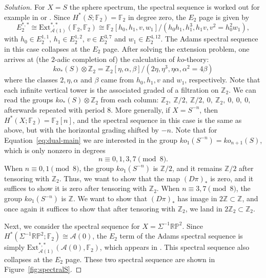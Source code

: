 \documentclass{amsart}
\def\RP{\mathbb{RP}}
\newcommand{\Ext}{\mathrm{Ext}}
\newcommand{\Steenrod}{\mathcal{A}}
\newcommand{\Aone}{\Steenrod(1)}
\newcommand{\Azero}{\Steenrod(0)}
\newcommand{\FF}{\mathbb{F}}
\newcommand{\ZZ}{\mathbb{Z}}
\begin{document}
\begin{proof}[Solution]
For $X=S$ the sphere spectrum, the spectral sequence is worked out
for example in \cite[Theorems 3.1.25 and 3.1.26]{Ravenel} or
\cite[Proposition 6.29]{RognesNotes}. Since
$H^*(S;\FF_2)=\FF_2$ in degree zero, the $E_2$ page is given by
\[
  E_2^{*, *} \cong \Ext^{*, *}_{\Aone}(\FF_2, \FF_2) \cong \FF_2[h_0, h_1, v, w_1] / (h_0h_1, h_1^3, h_1v, v^2=h_0^2w_1),
\]
with $h_0 \in E_2^{1,1}$, $h_1 \in E_2^{1,2}$, $v \in E_2^{3,7}$ and $w_1 \in E_2^{4, 12}$. The Adams spectral sequence in this case collapses at the $E_2$ page. After solving the extension problem, one arrives at (the $2$-adic completion of) the calculation of $ko$-theory:
\[
  ko_*(S) \otimes \ZZ_2 = \ZZ_2[\eta, \alpha, \beta]/(2\eta, \eta^3, \eta \alpha, \alpha^2 = 4\beta)
\]
where the classes $2, \eta, \alpha$ and $\beta$ came from
$h_0, h_1, v$ and $w_1$, respectively. Note that each infinite
vertical tower is the associated graded of a filtration on $\ZZ_2$. We
can read the groups $ko_*(S) \otimes \ZZ_2$ from each column:
$\ZZ_2, \ \ZZ/2, \ \ZZ/2, \ 0,\ \ZZ_2, \ 0, \ 0, \ 0,$ afterwards
repeated with period $8$.  More generally, if $X=S^{-n}$, then
$H^*(X;\FF_2)=\FF_2[n]$, and the spectral sequence in this case is the
same as above, but with the horizontal grading shifted by $-n$. Note
that for Equation~\eqref{eq:dual-main} we are interested in the
group $ko_1(S^{-n})= ko_{n+1}(S)$, which is only nonzero in degrees
\begin{equation}
\label{eq:ns}
 n \equiv 0, 1, 3, 7 \!\!\!\!\pmod{8}.
\end{equation}
When $n \equiv 0, 1 \!\!\pmod{8}$, the group $ko_1(S^{-n})$ is
$\ZZ/2$, and it remains $\ZZ/2$ after tensoring with $\ZZ_2$. Thus, we
want to show that the map $(D\pi)_*$ is zero, and it suffices to show
it is zero after tensoring with $\ZZ_2$. When
$n \equiv 3, 7 \!\!\pmod{8}$, the group $ko_1(S^{-n})$ is $\ZZ$. We
want to show that $(D\pi)_*$ has image in $2\ZZ \subset \ZZ$, and once
again it suffices to show that after tensoring with $\ZZ_2$, we land
in $2\ZZ_2 \subset \ZZ_2$.

Next, we consider the spectral sequence for $X=\Sigma^{-1}\RP^2$. Since
$H^*(\Sigma^{-1}\RP^2; \FF_2)\cong\Azero$, the $E_2$ term of the Adams spectral sequence is simply
$\Ext^{*, *}_{\Aone}(\Azero, \FF_2)$, which appears in \cite[Figure
24]{RognesNotes}. This spectral sequence also collapses at the $E_2$
page. These two spectral sequence are shown in
Figure~\ref{fig:spectralS}.




\end{proof}
\end{document}
